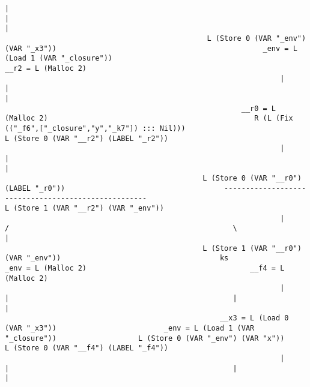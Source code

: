\begin{landscape}
\begin{lstlisting}[basicstyle=\fontsize{5.5}{6.5}\selectfont\ttfamily]
                                                                |                                                                                  |                                                                                  |
                                               L (Store 0 (VAR "_env") (VAR "_x3"))                                                _env = L (Load 1 (VAR "_closure"))                                                        __r2 = L (Malloc 2)
                                                                |                                                                                  |                                                                                  |
                                                       __r0 = L (Malloc 2)                                                R (L (Fix (("_f6",["_closure","y","_k7"]) ::: Nil)))                                      L (Store 0 (VAR "__r2") (LABEL "_r2"))
                                                                |                                                                                  |                                                                                  |
                                              L (Store 0 (VAR "__r0") (LABEL "_r0"))                                     ----------------------------------------------------                                       L (Store 1 (VAR "__r2") (VAR "_env"))
                                                                |                                                       /                                                    \                                                        |
                                              L (Store 1 (VAR "__r0") (VAR "_env"))                                     ks                                          _env = L (Malloc 2)                                      __f4 = L (Malloc 2)
                                                                |                                                       |                                                    |                                                        |
                                                  __x3 = L (Load 0 (VAR "_x3"))                         _env = L (Load 1 (VAR "_closure"))                   L (Store 0 (VAR "_env") (VAR "x"))                     L (Store 0 (VAR "__f4") (LABEL "_f4"))
                                                                |                                                       |                                                    |                                                        |

\end{lstlisting}
\end{landscape}
